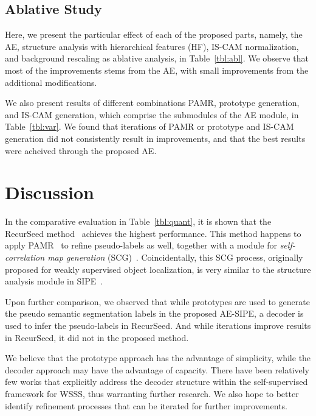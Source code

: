 \documentclass{article}
\begin{document}
\subsection{Ablative Study}
\label{sec:ablation}

Here, we present the particular effect of each of the proposed parts, namely, the AE, structure analysis with hierarchical features (HF), IS-CAM normalization, and background rescaling as ablative analysis, in Table~\ref{tbl:abl}. 
We observe that most of the improvements stems from the AE, with small improvements from the additional modifications.


We also present results of different combinations PAMR, prototype generation, and IS-CAM generation, which comprise the submodules of the AE module, in Table~\ref{tbl:var}. We found that iterations of PAMR or prototype and IS-CAM generation did not consistently result in improvements, and that the best results were acheived through the proposed AE. 



\section{Discussion}
\label{sec:discussion}

In the comparative evaluation in Table~\ref{tbl:quant}, it is shown that the RecurSeed method~\cite{RecurSeed} achieves the highest performance. 
This method happens to apply PAMR~\cite{PAMR} to refine pseudo-labels as well, together with a module for \emph{self-correlation map generation} (SCG)~\cite{SCG}. 
Coincidentally, this SCG process, originally proposed for weakly supervised object localization, is very similar to the structure analysis module in SIPE~\cite{SIPE}.

Upon further comparison, we observed that while prototypes are used to generate the pseudo semantic segmentation labels in the proposed AE-SIPE, a decoder is used to infer the pseudo-labels in RecurSeed. 
And while iterations improve results in RecurSeed, it did not in the proposed method. 

We believe that the prototype approach has the advantage of simplicity, while the decoder approach may have the advantage of capacity. 
There have been relatively few works that explicitly address the decoder structure within the self-supervised framework for WSSS, thus warranting further research.
We also hope to better identify refinement processes that can be iterated for further improvements.
\end{document}
